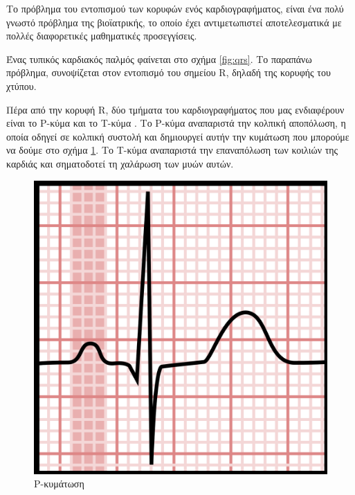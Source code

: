 Το πρόβλημα του εντοπισμού των κορυφών ενός καρδιογραφήματος, είναι ένα πολύ γνωστό πρόβλημα της βιοϊατρικής, το οποίο έχει αντιμετωπιστεί αποτελεσματικά με πολλές διαφορετικές μαθηματικές προσεγγίσεις. 

Ένας τυπικός καρδιακός παλμός φαίνεται στο σχήμα \ref{fig:qrs}. Το παραπάνω πρόβλημα, συνοψίζεται στον εντοπισμό του σημείου R, δηλαδή της κορυφής του χτύπου.

Πέρα από την κορυφή R, δύο τμήματα του καρδιογραφήματος που μας ενδιαφέρουν είναι το Ρ-κύμα \cite{wikiP_wave} και το Τ-κύμα \cite{wikiT_wave}.
Το Ρ-κύμα αναπαριστά την κολπική αποπόλωση, η οποία οδηγεί σε κολπική συστολή και δημιουργεί αυτήν την κυμάτωση που μπορούμε να δούμε στο σχήμα \ref{fig:p_wave}. Το Τ-κύμα αναπαριστά την επαναπόλωση των κοιλιών της καρδιάς και σηματοδοτεί τη χαλάρωση των μυών αυτών.

\begin{figure}[h]
    \centering
    \includegraphics[scale=0.1]{latex_code/Figures_new/p_wave.png}
    \caption{Ρ-κυμάτωση}
    \label{fig:p_wave}
\end{figure}

